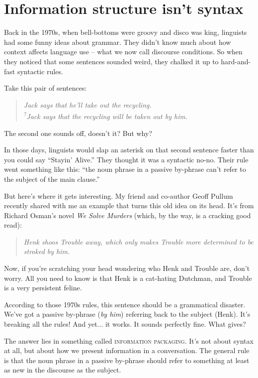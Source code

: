 \section{Information structure isn't syntax}

Back in the 1970s, when bell-bottoms were groovy and disco was king, linguists had some funny ideas about grammar. They didn't know much about how context affects language use -- what we now call discourse conditions. So when they noticed that some sentences sounded weird, they chalked it up to hard-and-fast syntactic rules.

Take this pair of sentences:

\begin{quote}
\textit{Jack says that he'll take out the recycling.}\\
\textsuperscript{?}\textit{Jack says that the recycling will be taken out by him.}
\end{quote}

The second one sounds off, doesn't it? But why? 

In those days, linguists would slap an asterisk on that second sentence faster than you could say ``Stayin' Alive.'' They thought it was a syntactic no-no. Their rule went something like this: ``the noun phrase in a passive by-phrase can't refer to the subject of the main clause.''

But here's where it gets interesting. My friend and co-author Geoff Pullum recently shared with me an example that turns this old idea on its head. It's from Richard Osman's novel \textit{We Solve Murders} (which, by the way, is a cracking good read):

\begin{quote}
\textit{Henk shoos Trouble away, which only makes Trouble more determined to be stroked by him.}
\end{quote}

Now, if you're scratching your head wondering who Henk and Trouble are, don't worry. All you need to know is that Henk is a cat-hating Dutchman, and Trouble is a very persistent feline.

According to those 1970s rules, this sentence should be a grammatical disaster. We've got a passive by-phrase (\textit{by him}) referring back to the subject (Henk). It's breaking all the rules! And yet... it works. It sounds perfectly fine. What gives?

The answer lies in something called \textsc{information packaging}. It's not about syntax at all, but about how we present information in a conversation. The general rule is that the noun phrase in a passive by-phrase should refer to something at least as new in the discourse as the subject.

